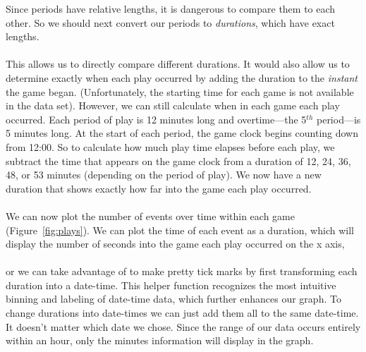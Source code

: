 \documentclass[article]{jss}
\begin{document}
Since periods have relative lengths, it is dangerous to compare them to each other. So we should next convert our periods to \emph{durations}, which have exact lengths.\\

\\

This allows us to directly compare different durations. It would also allow us to determine exactly when each play occurred by adding the duration to the \emph{instant} the game began. (Unfortunately, the starting time for each game is not available in the data set). However, we can still calculate when in each game each play occurred. Each period of play is 12 minutes long and overtime---the 5$^{th}$ period---is 5 minutes long. At the start of each period, the game clock begins counting down from 12:00. So to calculate how much play time elapses before each play, we subtract the time that appears on the game clock from a duration of 12, 24, 36, 48, or 53 minutes (depending on the period of play). We now have a new duration that shows exactly how far into the game each play occurred.\\

\\

We can now plot the number of events over time within each game (Figure~\ref{fig:plays}). We can plot the time of each event as a duration, which will display the number of seconds into the game each play occurred on the x axis, \\

\\

or we can take advantage of  to make pretty tick marks by first transforming each duration into a date-time. This helper function recognizes the most intuitive binning and labeling of date-time data, which further enhances our graph. To change durations into date-times we can just add them all to the same date-time. It doesn't matter which date we chose. Since the range of our data occurs entirely within an hour, only the minutes information will display in the graph.\\

\\
\\
\end{document}
